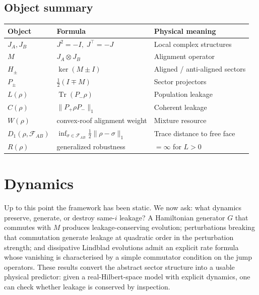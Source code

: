 \documentclass[a4paper,onecolumn,noarxiv]{quantumarticle}
\theoremstyle{plain}
\theoremstyle{definition}
\theoremstyle{remark}
\newcommand{\Pplus}{P_{+}}
\newcommand{\Pminus}{P_{-}}
\newcommand{\Mop}{M}
\newcommand{\FAB}{\mathcal{F}_{AB}}
\newcommand{\Tr}{\operatorname{Tr}}
\newcommand{\Lleak}{L}
\begin{document}
\subsection{Object summary}
\label{sec:object-summary}

\begin{center}
\renewcommand{\arraystretch}{1.15}
\begin{tabular}{@{}lll@{}}
\toprule
Object & Formula & Physical meaning \\
\midrule
$J_A,J_B$ & $J^2=-I,\;J^\top=-J$ & Local complex structures \\
$\Mop$ & $J_A\otimes J_B$ & Alignment operator \\
$H_\pm$ & $\ker(\Mop\pm I)$ & Aligned / anti-aligned sectors \\
$P_\pm$ & $\tfrac{1}{2}(I\mp\Mop)$ & Sector projectors \\
$\Lleak(\rho)$ & $\Tr(\Pminus\rho)$ & Population leakage \\
$C(\rho)$ & $\|\Pplus\rho\Pminus\|_1$ & Coherent leakage \\
$W(\rho)$ & convex-roof alignment weight & Mixture resource \\
$D_1(\rho,\FAB)$ & $\inf_{\sigma\in\FAB}\tfrac{1}{2}\|\rho-\sigma\|_1$
  & Trace distance to free face \\
$R(\rho)$ & generalized robustness & $=\infty$ for $\Lleak>0$ \\
\bottomrule
\end{tabular}
\end{center}

\section{Dynamics}
\label{sec:dynamics}

Up to this point the framework has been static. We now ask: what dynamics preserve,
generate, or destroy same-$i$ leakage? A Hamiltonian generator $G$ that commutes
with $\Mop$ produces leakage-conserving evolution; perturbations breaking that
commutation generate leakage at quadratic order in the perturbation strength; and
dissipative Lindblad evolutions admit an explicit rate formula whose vanishing is
characterised by a simple commutator condition on the jump operators. These results
convert the abstract sector structure into a usable physical predictor: given a
real-Hilbert-space model with explicit dynamics, one can check whether leakage is
conserved by inspection.
\end{document}
